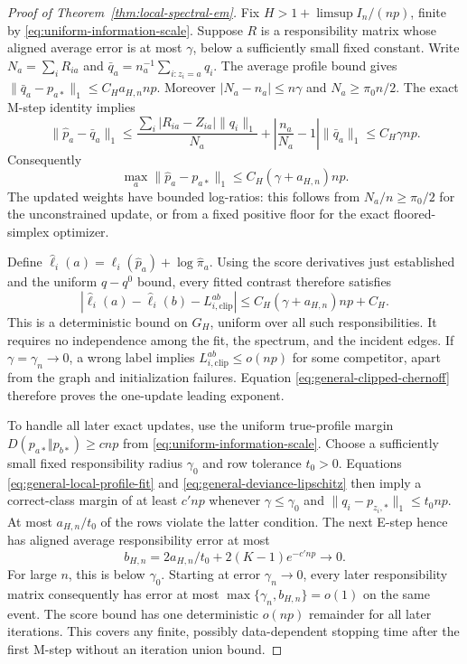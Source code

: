 \begin{proof}[Proof of Theorem~\ref{thm:local-spectral-em}]
Fix $H>1+\limsup I_n/(np)$, finite by \eqref{eq:uniform-information-scale}. Suppose $R$ is a responsibility matrix whose aligned average
error is at most $\gamma$, below a sufficiently small fixed
constant.  Write $N_a=\sum_iR_{ia}$ and
$\bar q_a=n_a^{-1}\sum_{i:z_i=a}q_i$.  The average profile bound
gives $\|\bar q_a-p_{a*}\|_1\le C_Ha_{H,n}np$.
Moreover $|N_a-n_a|\le n\gamma$ and
$N_a\ge\pi_0n/2$.  The exact M-step identity implies
\[
 \|\widehat p_a-\bar q_a\|_1
 \le\frac{\sum_i|R_{ia}-Z_{ia}|\|q_i\|_1}{N_a}
    +\left|\frac{n_a}{N_a}-1\right|\|\bar q_a\|_1
 \le C_H\gamma np.
\]
Consequently
\begin{equation}
 \max_a\|\widehat p_a-p_{a*}\|_1
       \le C_H(\gamma+a_{H,n})np.
 \label{eq:general-local-profile-fit}
\end{equation}
The updated weights have bounded log-ratios: this follows from
$N_a/n\ge\pi_0/2$ for the unconstrained update, or from a fixed
positive floor for the exact floored-simplex optimizer.

Define $\widehat\ell_i(a)=\ell_i(\widehat p_a)+\log\widehat\pi_a$. Using the score derivatives just established and the uniform
$q-q^0$ bound, every fitted contrast therefore satisfies
\begin{equation}
 \left|\widehat\ell_i(a)-\widehat\ell_i(b)
       -L_{i,\mathrm{clip}}^{ab}\right|
       \le C_H(\gamma+a_{H,n})np+C_H.
 \label{eq:general-local-score-fit}
\end{equation}
This is a deterministic bound on $G_H$, uniform over all such
responsibilities.  It requires no independence among the fit,
the spectrum, and the incident edges.  If $\gamma=\gamma_n\to0$,
a wrong label implies
$L_{i,\mathrm{clip}}^{ab}\le o(np)$ for some competitor, apart
from the graph and initialization failures.  Equation
\eqref{eq:general-clipped-chernoff} therefore proves the
one-update leading exponent.

To handle all later exact updates, use the uniform true-profile
margin $D(p_{a*}\Vert p_{b*})\ge cnp$ from
\eqref{eq:uniform-information-scale}.  Choose a sufficiently
small fixed responsibility radius $\gamma_0$ and row tolerance
$t_0>0$.  Equations \eqref{eq:general-local-profile-fit} and
\eqref{eq:general-deviance-lipschitz} then imply a correct-class
margin of at least $c'np$ whenever $\gamma\le\gamma_0$ and
$\|q_i-p_{z_i,*}\|_1\le t_0np$.  At most $a_{H,n}/t_0$ of the
rows violate the latter condition.  The next E-step hence has
aligned average responsibility error at most
\begin{equation}
 b_{H,n}=2a_{H,n}/t_0+2(K-1)e^{-c'np}\longrightarrow0.
 \label{eq:general-basin-invariance}
\end{equation}
For large $n$, this is below $\gamma_0$.  Starting at error
$\gamma_n\to0$, every later responsibility matrix consequently
has error at most $\max\{\gamma_n,b_{H,n}\}=o(1)$ on the same
event.  The score bound has one deterministic $o(np)$ remainder
for all later iterations.  This covers any finite, possibly
data-dependent stopping time after the first M-step without
an iteration union bound.


\end{proof}
